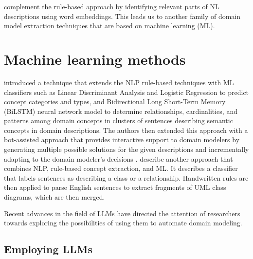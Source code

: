 \citet{Burgueno2021} complement the rule-based approach by identifying relevant parts of NL descriptions using word embeddings.
This leads us to another family of domain model extraction techniques that are based on machine learning (ML).


\section{Machine learning methods}

\citet{Saini2020,Saini2020a,Saini2020b} introduced a technique that extends the NLP rule-based techniques with ML classifiers such as Linear Discriminant Analysis and Logistic Regression to predict concept categories and types, and Bidirectional Long Short-Term Memory (BiLSTM) neural network model to determine relationships, cardinalities, and patterns among domain concepts in clusters of sentences describing semantic concepts in domain descriptions.
The authors then extended this approach with a bot-assisted approach that provides interactive support to domain modelers by generating multiple possible solutions for the given descriptions and incrementally adapting to the domain modeler's decisions \cite{Saini2022}.
\citet{Yang2022} describe another approach that combines NLP, rule-based concept extraction, and ML. It describes a classifier that labels sentences as describing a class or a relationship. Handwritten rules are then applied to parse English sentences to extract fragments of UML class diagrams, which are then merged.

Recent advances in the field of LLMs have directed the attention of researchers towards exploring the possibilities of using them to automate domain modeling.


\subsection{Employing LLMs}

